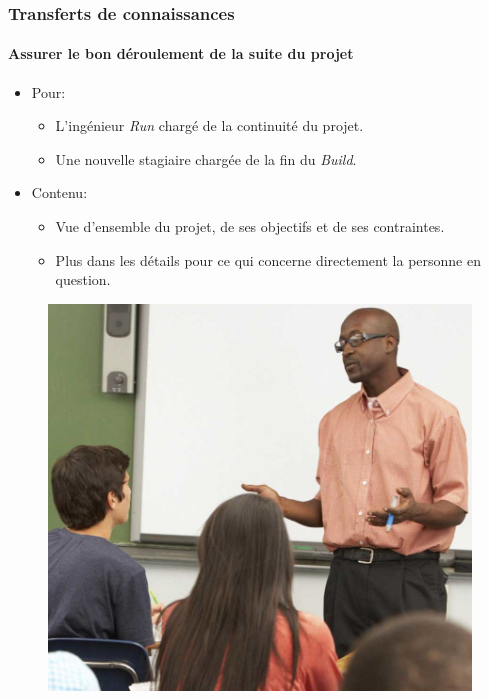 \documentclass[french, a4paper]{beamer}
\begin{document}
\begin{frame}
    \frametitle{Transferts de connaissances}
    \framesubtitle{Assurer le bon déroulement de la suite du projet}
    \begin{minipage}{0.5\textwidth}
        \begin{itemize}
            \item Pour:
            \begin{itemize}
                \item L'ingénieur \textit{Run} chargé de la continuité du projet.
                \item Une nouvelle stagiaire chargée de la fin du \textit{Build}.
            \end{itemize}
            \item Contenu:
            \begin{itemize}
                \item Vue d'ensemble du projet, de ses objectifs et de ses
                    contraintes.
                \item Plus dans les détails pour ce qui concerne directement la
                    personne en question.
            \end{itemize}
        \end{itemize}
    \end{minipage}%
    \hfill
    \begin{minipage}{0.4\textwidth}
        \begin{figure}[h!]
            \centering
            \includegraphics[width = \linewidth]{img/misc/teacher.jpg}%
            \label{fig:misc/teacher}
        \end{figure}
    \end{minipage}
\end{frame}
\end{document}
